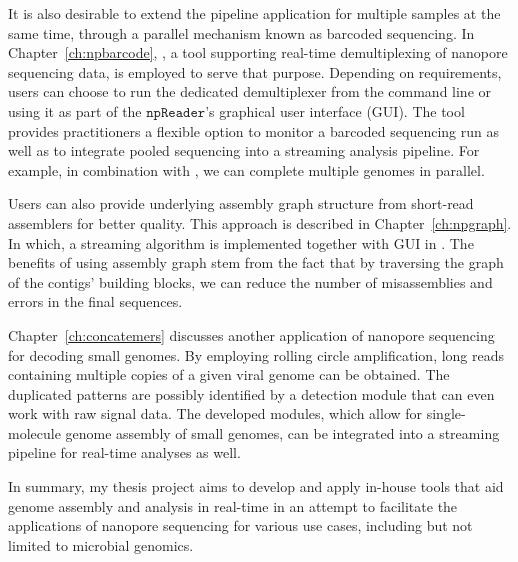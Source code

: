 It is also desirable to extend the pipeline application for multiple samples at the same time, through a parallel mechanism known as barcoded sequencing.
In Chapter~\ref{ch:npbarcode}, \npbarcode{}, a tool supporting real-time demultiplexing of nanopore sequencing data, is employed to serve that purpose. 
Depending on requirements, users can choose to run the dedicated demultiplexer from the command line or using it as part of the $\mathtt{npReader}$'s graphical user interface (GUI). The tool provides practitioners a flexible option to monitor a barcoded sequencing run as well as to integrate pooled sequencing into a streaming analysis pipeline. For example, in combination with \npscarf{}, we can complete multiple genomes in parallel.

Users can also provide underlying assembly graph structure from short-read assemblers for better quality. This approach is described in Chapter~\ref{ch:npgraph}. In which, a streaming algorithm is implemented together with GUI in \npgraph{}. The benefits of using assembly graph stem from the fact that by traversing the graph of the contigs' building blocks, we can reduce the number of misassemblies and errors in the final sequences. 

Chapter~\ref{ch:concatemers} discusses another application of nanopore sequencing for decoding small genomes. By employing rolling circle amplification, long reads containing multiple copies of a given viral genome can be obtained. The duplicated patterns are possibly identified by a detection module that can even work with raw signal data. The developed modules, which allow for single-molecule genome assembly of small genomes, can be integrated into a streaming pipeline for real-time analyses as well.

In summary, my thesis project aims to develop and apply in-house tools that aid genome assembly and analysis in real-time in an attempt to facilitate the applications of nanopore sequencing for various use cases, including but not limited to microbial genomics.
